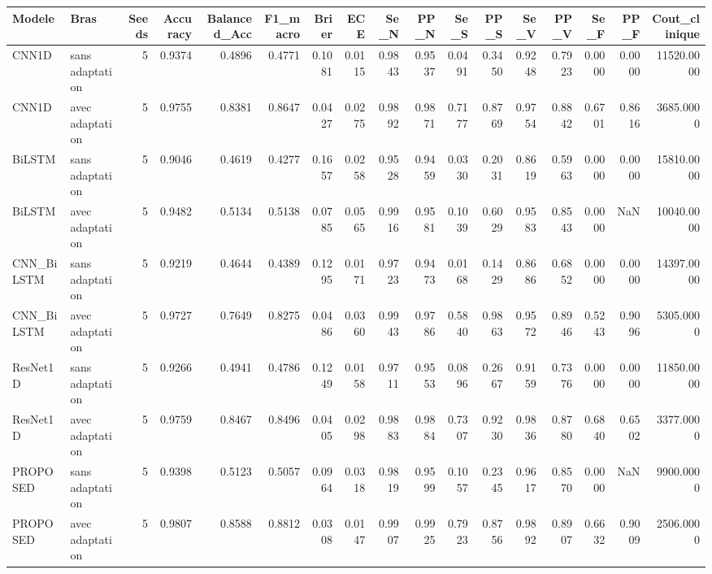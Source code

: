 \begin{tabular}{llrrrrrrrrrrrrrrr}
\toprule
Modele & Bras & Seeds & Accuracy & Balanced_Acc & F1_macro & Brier & ECE & Se_N & PP_N & Se_S & PP_S & Se_V & PP_V & Se_F & PP_F & Cout_clinique \\
\midrule
CNN1D & sans adaptation & 5 & 0.9374 & 0.4896 & 0.4771 & 0.1081 & 0.0115 & 0.9843 & 0.9537 & 0.0491 & 0.3450 & 0.9248 & 0.7923 & 0.0000 & 0.0000 & 11520.0000 \\
CNN1D & avec adaptation & 5 & 0.9755 & 0.8381 & 0.8647 & 0.0427 & 0.0275 & 0.9892 & 0.9871 & 0.7177 & 0.8769 & 0.9754 & 0.8842 & 0.6701 & 0.8616 & 3685.0000 \\
BiLSTM & sans adaptation & 5 & 0.9046 & 0.4619 & 0.4277 & 0.1657 & 0.0258 & 0.9528 & 0.9459 & 0.0330 & 0.2031 & 0.8619 & 0.5963 & 0.0000 & 0.0000 & 15810.0000 \\
BiLSTM & avec adaptation & 5 & 0.9482 & 0.5134 & 0.5138 & 0.0785 & 0.0565 & 0.9916 & 0.9581 & 0.1039 & 0.6029 & 0.9583 & 0.8543 & 0.0000 & NaN & 10040.0000 \\
CNN_BiLSTM & sans adaptation & 5 & 0.9219 & 0.4644 & 0.4389 & 0.1295 & 0.0171 & 0.9723 & 0.9473 & 0.0168 & 0.1429 & 0.8686 & 0.6852 & 0.0000 & 0.0000 & 14397.0000 \\
CNN_BiLSTM & avec adaptation & 5 & 0.9727 & 0.7649 & 0.8275 & 0.0486 & 0.0360 & 0.9943 & 0.9786 & 0.5840 & 0.9863 & 0.9572 & 0.8946 & 0.5243 & 0.9096 & 5305.0000 \\
ResNet1D & sans adaptation & 5 & 0.9266 & 0.4941 & 0.4786 & 0.1249 & 0.0158 & 0.9711 & 0.9553 & 0.0896 & 0.2667 & 0.9159 & 0.7376 & 0.0000 & 0.0000 & 11850.0000 \\
ResNet1D & avec adaptation & 5 & 0.9759 & 0.8467 & 0.8496 & 0.0405 & 0.0298 & 0.9883 & 0.9884 & 0.7307 & 0.9230 & 0.9836 & 0.8780 & 0.6840 & 0.6502 & 3377.0000 \\
PROPOSED & sans adaptation & 5 & 0.9398 & 0.5123 & 0.5057 & 0.0964 & 0.0318 & 0.9819 & 0.9599 & 0.1057 & 0.2345 & 0.9617 & 0.8570 & 0.0000 & NaN & 9900.0000 \\
PROPOSED & avec adaptation & 5 & 0.9807 & 0.8588 & 0.8812 & 0.0308 & 0.0147 & 0.9907 & 0.9925 & 0.7923 & 0.8756 & 0.9892 & 0.8907 & 0.6632 & 0.9009 & 2506.0000 \\
\bottomrule
\end{tabular}
